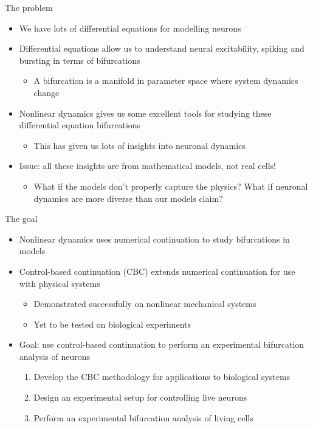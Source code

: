 \documentclass[presentation]{beamer}
\author{Mark Blyth}
\date{}
\title{}
\begin{document}
\begin{frame}[label={sec:orgd214be2}]{The problem}
\begin{itemize}
\item We have lots of differential equations for modelling neurons
\item Differential equations allow us to understand neural excitability, spiking and bursting in terms of bifurcations
\begin{itemize}
\item A bifurcation is a manifold in parameter space where system dynamics change
\end{itemize}
\item Nonlinear dynamics gives us some excellent tools for studying these differential equation bifurcations
\begin{itemize}
\item This has given us lots of insights into neuronal dynamics
\end{itemize}
\item Issue: all these insights are from mathematical models, not real cells!
\begin{itemize}
\item What if the models don't properly capture the physics? What if neuronal dynamics are more diverse than our models claim?
\end{itemize}
\end{itemize}
\end{frame}

\begin{frame}[label={sec:org2e23df2}]{The goal}
\begin{itemize}
\item Nonlinear dynamics uses numerical continuation to study bifurcations in models
\item Control-based continuation (CBC) extends numerical continuation for use with physical systems
\begin{itemize}
\item Demonstrated successfully on nonlinear mechanical systems
\item Yet to be tested on biological experiments
\end{itemize}
\item Goal: use control-based continuation to perform an experimental bifurcation analysis of neurons
\begin{enumerate}
\item Develop the CBC methodology for applications to biological systems
\item Design an experimental setup for controlling live neurons
\item Perform an experimental bifurcation analysis of living cells
\end{enumerate}
\end{itemize}
\end{frame}
\end{document}

